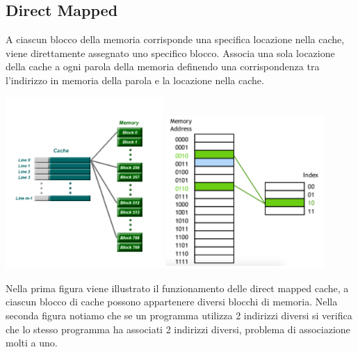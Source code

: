 \documentclass[12pt, a4paper, openany]{book}
\begin{document}
\subsection*{Direct Mapped}
A ciascun blocco della memoria corrisponde una specifica locazione nella cache, viene direttamente assegnato
uno specifico blocco.
Associa una sola locazione della cache a ogni parola della memoria definendo una corrispondenza tra l'indirizzo
in memoria della parola e la locazione nella cache.
\begin{center}
    \includegraphics[width=60mm, scale=0.5]{Direct mapped cache.png}
    \includegraphics[width=60mm, scale=0.5]{Direct mapped cache conflict.png}
\end{center}
Nella prima figura viene illustrato il funzionamento delle direct mapped cache, a ciascun
blocco di cache possono appartenere diversi blocchi di memoria.
Nella seconda figura notiamo che se un programma utilizza 2 indirizzi diversi si verifica
che lo stesso programma ha associati 2 indirizzi diversi, problema di associazione molti a uno.
\end{document}
